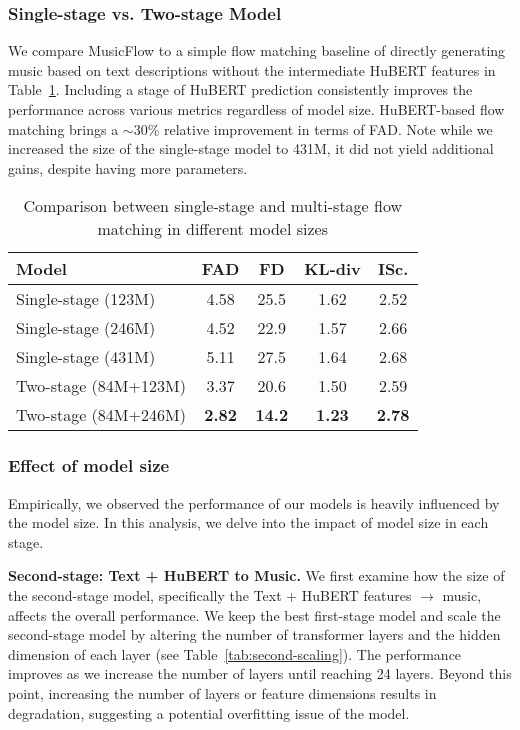\subsubsection{Single-stage vs. Two-stage Model} 
We compare MusicFlow to a simple flow matching baseline of directly generating music based on text descriptions without the intermediate HuBERT features in Table~\ref{tab:2vs1}. Including a stage of HuBERT prediction consistently improves the performance across various metrics regardless of model size. HuBERT-based flow matching brings a $\sim 30\%$ relative improvement in terms of FAD. 
Note while we increased the size of the single-stage model to 431M, it did not yield additional gains, despite having more parameters.

\begin{table}[h]
\caption{Comparison between single-stage and multi-stage flow matching in different model sizes}
\label{tab:2vs1}
\begin{center}
\begin{small}
\begin{sc}
\begin{tabular}{lcccc}
\toprule
Model & FAD & FD & KL-div & ISc.  \\
\midrule
Single-stage (123M) & 4.58 & 25.5 & 1.62  & 2.52 \\
Single-stage (246M) & 4.52 & 22.9 & 1.57  & 2.66 \\
Single-stage (431M) & 5.11 & 27.5 &  1.64 & 2.68 \\
Two-stage (84M+123M) & 3.37 & 20.6 & 1.50  & 2.59 \\
Two-stage (84M+246M) & \textbf{2.82} & \textbf{14.2} & \textbf{1.23}& \textbf{2.78}\\
\bottomrule
\end{tabular}
\end{sc}
\end{small}
\end{center}
\end{table}

\subsubsection{Effect of model size}
\label{sec:ablation-model-size}
Empirically, we observed the performance of our models is heavily influenced by the model size. In this analysis, we delve into the impact of model size in each stage.

\noindent\textbf{Second-stage: Text + HuBERT to Music.} We first examine how the size of the second-stage model, specifically the Text + HuBERT features $\rightarrow$ music, affects the overall performance. We keep the best first-stage model and scale the second-stage model by altering the number of transformer layers and the hidden dimension of each layer (see Table~\ref{tab:second-scaling}). The performance improves as we increase the number of layers until reaching 24 layers. 
Beyond this point, increasing the number of layers or feature dimensions results in degradation, suggesting a potential overfitting issue of the model.

